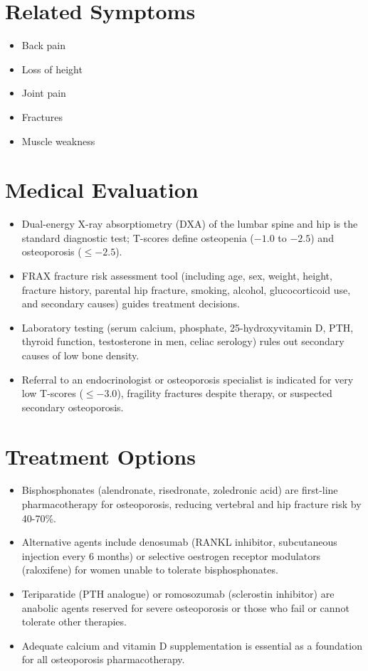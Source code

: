 \section*{Related Symptoms}
\begin{itemize}
  \item Back pain
  \item Loss of height
  \item Joint pain
  \item Fractures
  \item Muscle weakness
\end{itemize}


\section*{Medical Evaluation}
\begin{itemize}
\item Dual-energy X-ray absorptiometry (DXA) of the lumbar spine and hip is the standard diagnostic test; T-scores define osteopenia ($-1.0$ to $-2.5$) and osteoporosis ($\leq -2.5$).
 \item FRAX fracture risk assessment tool (including age, sex, weight, height, fracture history, parental hip fracture, smoking, alcohol, glucocorticoid use, and secondary causes) guides treatment decisions.
 \item Laboratory testing (serum calcium, phosphate, 25-hydroxyvitamin D, PTH, thyroid function, testosterone in men, celiac serology) rules out secondary causes of low bone density.
 \item Referral to an endocrinologist or osteoporosis specialist is indicated for very low T-scores ($\leq -3.0$), fragility fractures despite therapy, or suspected secondary osteoporosis.
\end{itemize}

\section*{Treatment Options}
\begin{itemize}
  \item Bisphosphonates (alendronate, risedronate, zoledronic acid) are first-line pharmacotherapy for osteoporosis, reducing vertebral and hip fracture risk by 40-70\%.
  \item Alternative agents include denosumab (RANKL inhibitor, subcutaneous injection every 6 months) or selective oestrogen receptor modulators (raloxifene) for women unable to tolerate bisphosphonates.
  \item Teriparatide (PTH analogue) or romosozumab (sclerostin inhibitor) are anabolic agents reserved for severe osteoporosis or those who fail or cannot tolerate other therapies.
  \item Adequate calcium and vitamin D supplementation is essential as a foundation for all osteoporosis pharmacotherapy.
\end{itemize}

